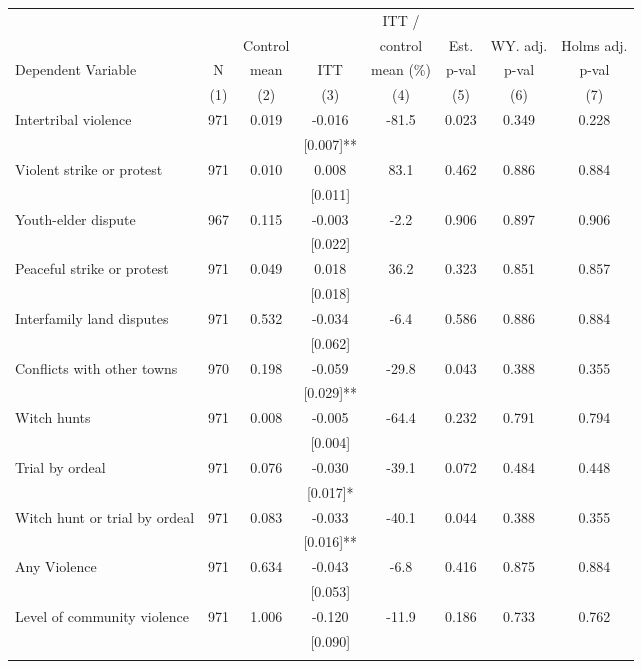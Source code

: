 \begin{tabular}{lccccccc}
\hline \noalign{\smallskip} &  &  &  & ITT / &  &  & \\
 &  & Control &  & control & Est. & WY. adj. & Holms adj.\\
Dependent Variable & N & mean & ITT & mean (\%) & p-val & p-val & p-val\\
 & (1) & (2) & (3) & (4) & (5) & (6) & (7)\\
\noalign{\smallskip}\hline \noalign{\smallskip}\quad Intertribal violence & 971 & 0.019 & -0.016 & -81.5 & 0.023 & 0.349 & 0.228\\
 &  &  & [0.007]** &  &  &  & \\
\quad Violent strike or protest & 971 & 0.010 & 0.008 & 83.1 & 0.462 & 0.886 & 0.884\\
 &  &  & [0.011] &  &  &  & \\
\quad Youth-elder dispute & 967 & 0.115 & -0.003 & -2.2 & 0.906 & 0.897 & 0.906\\
 &  &  & [0.022] &  &  &  & \\
\quad Peaceful strike or protest & 971 & 0.049 & 0.018 & 36.2 & 0.323 & 0.851 & 0.857\\
 &  &  & [0.018] &  &  &  & \\
\quad Interfamily land disputes & 971 & 0.532 & -0.034 & -6.4 & 0.586 & 0.886 & 0.884\\
 &  &  & [0.062] &  &  &  & \\
\quad Conflicts with other towns & 970 & 0.198 & -0.059 & -29.8 & 0.043 & 0.388 & 0.355\\
 &  &  & [0.029]** &  &  &  & \\
\quad Witch hunts & 971 & 0.008 & -0.005 & -64.4 & 0.232 & 0.791 & 0.794\\
 &  &  & [0.004] &  &  &  & \\
\quad Trial by ordeal & 971 & 0.076 & -0.030 & -39.1 & 0.072 & 0.484 & 0.448\\
 &  &  & [0.017]* &  &  &  & \\
\quad Witch hunt or trial by ordeal & 971 & 0.083 & -0.033 & -40.1 & 0.044 & 0.388 & 0.355\\
 &  &  & [0.016]** &  &  &  & \\
Any Violence & 971 & 0.634 & -0.043 & -6.8 & 0.416 & 0.875 & 0.884\\
 &  &  & [0.053] &  &  &  & \\
Level of community violence & 971 & 1.006 & -0.120 & -11.9 & 0.186 & 0.733 & 0.762\\
 &  &  & [0.090] &  &  &  & \\
\noalign{\smallskip}\hline\end{tabular}
